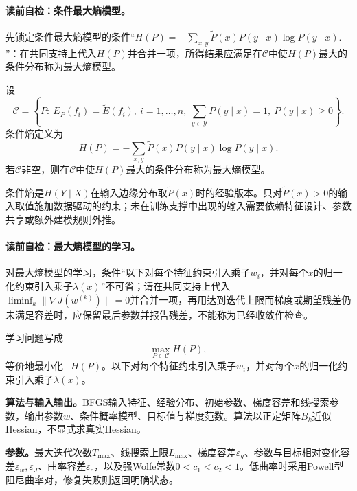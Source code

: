 \paragraph{读前自检：条件最大熵模型。}先锁定条件最大熵模型的条件“$H(P)=-\sum_{x,y}\widetilde P(x)P(y\mid x)\log P(y\mid x).$”：在共同支持上代入$H(P)$并合并一项，所得结果应满足在$\mathcal C$中使$H(P)$最大的条件分布称为最大熵模型。\par

\begin{definition}[条件最大熵模型]\label{def:V3-C01-conditional-maxent}
设
\[
\mathcal C=\left\{P:\ E_P(f_i)=\widetilde E(f_i),\ i=1,\ldots,n,\
\sum_{y\in\mathcal Y}P(y\mid x)=1,\ P(y\mid x)\geq0\right\}.
\]
条件熵定义为
\[
H(P)=-\sum_{x,y}\widetilde P(x)P(y\mid x)\log P(y\mid x).
\]
若$\mathcal C$非空，则在$\mathcal C$中使$H(P)$最大的条件分布称为最大熵模型。
\end{definition}

条件熵是$H(Y\mid X)$在输入边缘分布取$\widetilde P(x)$时的经验版本。只对$\widetilde P(x)>0$的输入取值施加数据驱动的约束；未在训练支撑中出现的输入需要依赖特征设计、参数共享或额外建模规则外推。


\paragraph{读前自检：最大熵模型的学习。}对最大熵模型的学习，条件“以下对每个特征约束引入乘子$w_i$，并对每个$x$的归一化约束引入乘子$\lambda(x)$”不可省；请在共同支持上代入$\liminf_k\|\nabla J(w^{(k)})\|=0$并合并一项，再用达到迭代上限而梯度或期望残差仍未满足容差时，应保留最后参数并报告残差，不能称为已经收敛作检查。\par

学习问题写成
\[
\max_{P\in\mathcal C}H(P),
\]
等价地最小化$-H(P)$。以下对每个特征约束引入乘子$w_i$，并对每个$x$的归一化约束引入乘子$\lambda(x)$。

\label{struct:V3-C01-CH19}
\phantomsection\label{struct:V3-C01-CH20}
\textbf{算法与输入输出。}BFGS输入特征、经验分布、初始参数、梯度容差和线搜索参数，输出参数$w$、条件概率模型、目标值与梯度范数。算法以正定矩阵$B_k$近似Hessian，不显式求真实Hessian。

\label{struct:V3-C01-CH21}
\textbf{参数。}最大迭代次数$T_{\max}$、线搜索上限$L_{\max}$、梯度容差$\varepsilon_g$、参数与目标相对变化容差$\varepsilon_w,\varepsilon_J$、曲率容差$\varepsilon_c$，以及强Wolfe常数$0<c_1<c_2<1$。低曲率时采用Powell型阻尼曲率对，修复失败则返回明确状态。

